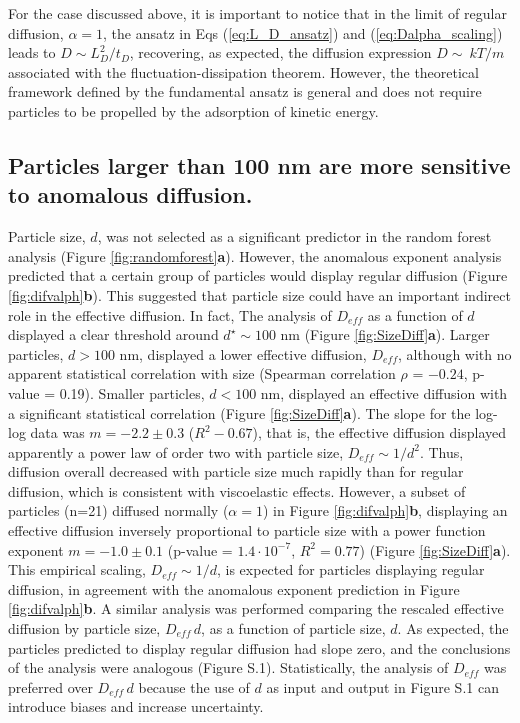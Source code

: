 \documentclass[aps,prl,preprint,superscriptaddress,showkeys,linenumbers]{revtex4-1}
\begin{document}
For the case discussed above, it is important to notice that in the limit of regular diffusion, $\alpha = 1$, the ansatz in Eqs (\ref{eq:L_D_ansatz}) and (\ref{eq:Dalpha_scaling}) leads to $D \sim L_D^2/t_D$, recovering, as expected, the diffusion expression $D \sim ~ kT/m$ associated with the fluctuation-dissipation theorem.
However, the theoretical framework defined by the fundamental ansatz is general and does not require particles to be propelled by the adsorption of kinetic energy.

\subsection*{\textcolor{Antonio}{Particles larger than 100 nm are more sensitive to anomalous diffusion.}}
Particle size, $d$, was not selected as a significant predictor in the random forest analysis (Figure \ref{fig:randomforest}\textbf{a}). However, the anomalous exponent analysis predicted that a certain group of particles would display regular diffusion (Figure \ref{fig:difvalph}\textbf{b}). This suggested that particle size could have an important indirect role in the effective diffusion. In fact, The analysis of $D_{eff}$ as a function of $d$ displayed a clear threshold around $d^{\star} \sim 100$ nm (Figure \ref{fig:SizeDiff}\textbf{a}).
Larger particles, $d>100$ nm, displayed a lower effective diffusion, $D_{eff}$, although with no apparent statistical correlation with size (Spearman correlation $\rho$ = $-0.24$, p-value = 0.19).
Smaller particles, $d< 100$ nm, displayed an effective diffusion with a significant statistical correlation (Figure \ref{fig:SizeDiff}\textbf{a}). The slope for the log-log data was $m = -2.2 \pm 0.3$ ($R^2 - 0.67$), that is, the effective diffusion displayed apparently a power law of order two with particle size, $D_{eff} \sim 1/d^2$. Thus, diffusion overall decreased with particle size much rapidly than for regular diffusion, which is consistent with viscoelastic effects. However, a subset of particles (n=21) diffused normally ($\alpha = 1$) in Figure \ref{fig:difvalph}\textbf{b}, displaying 
an effective diffusion inversely proportional to particle size with a power function exponent $m = -1.0 \pm 0.1$ (p-value = $1.4 \cdot 10^{-7}$, $R^2 = 0.77$) (Figure \ref{fig:SizeDiff}\textbf{a}). 
This empirical scaling, $D_{eff}\sim 1/d$, is expected for particles displaying regular diffusion, in agreement with the anomalous exponent prediction in Figure \ref{fig:difvalph}\textbf{b}.
A similar analysis was performed comparing the rescaled effective diffusion by particle size, $D_{eff}\, d$, as a function of particle size, $d$. As expected, the particles predicted to display regular diffusion had slope zero, and the conclusions of the analysis were analogous (Figure S.1). Statistically, the analysis of $D_{eff}$ was preferred over $D_{eff} \, d$ because the use of $d$ as input and output in Figure S.1 can introduce biases and increase uncertainty.
\end{document}
